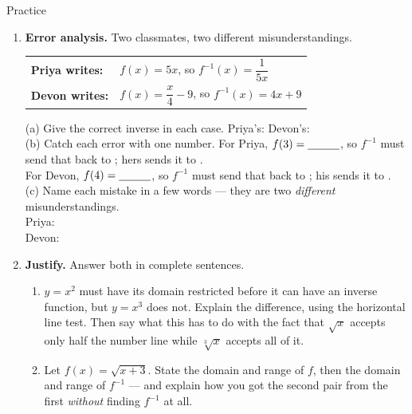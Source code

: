 \documentclass[10pt]{article}
\begin{document}
\begin{notesbox}{Practice}
\begin{enumerate}[leftmargin=1.9em, itemsep=11pt]
  \item \textbf{Error analysis.} Two classmates, two different misunderstandings.
    \begin{center}
    \begin{tcolorbox}[colback=white, colframe=charcoal!45, boxrule=0.7pt, arc=1.5mm,
        width=0.80\linewidth, left=3mm, right=3mm, top=1.5mm, bottom=1.5mm]
    \centering\small
    \renewcommand{\arraystretch}{1.5}
    \begin{tabular}{@{}l l@{}}
    \textbf{Priya writes:} & $f(x)=5x$, \; so \; $f^{-1}(x)=\dfrac{1}{5x}$ \\
    \textbf{Devon writes:} & $f(x)=\dfrac{x}{4}-9$, \; so \; $f^{-1}(x)=4x+9$ \\
    \end{tabular}
    \end{tcolorbox}
    \end{center}
    \vspace{-4pt}
    (a) Give the correct inverse in each case. \; Priya's: \blank{2.4cm} \; Devon's:
    \blank{2.6cm} \\[3pt]
    (b) Catch each error with one number. For Priya, $f(3)=\blank{1.0cm}$, so $f^{-1}$ must send
    that back to \blank{1.0cm}; hers sends it to \blank{1.4cm}. \\[3pt]
    \hspace*{0.3in} For Devon, $f(4)=\blank{1.0cm}$, so $f^{-1}$ must send that back to
    \blank{1.0cm}; his sends it to \blank{1.4cm}. \\[3pt]
    (c) Name each mistake in a few words --- they are two \emph{different} misunderstandings. \\[2pt]
    Priya: \blank{5.4cm} \\[3pt]
    Devon: \blank{5.4cm}

  \item \textbf{Justify.} Answer both in complete sentences.
    \begin{enumerate}[label=(\alph*), leftmargin=1.9em, itemsep=4pt]
      \item $y=x^{2}$ must have its domain restricted before it can have an inverse function, but
            $y=x^{3}$ does not. Explain the difference, using the horizontal line test. Then say
            what this has to do with the fact that $\sqrt{x}$ accepts only half the number line
            while $\sqrt[3]{x}$ accepts all of it.
      \item Let $f(x)=\sqrt{x+3}$. State the domain and range of $f$, then the domain and range of
            $f^{-1}$ --- and explain how you got the second pair from the first \emph{without}
            finding $f^{-1}$ at all.
    \end{enumerate}
\end{enumerate}
\end{notesbox}
\end{document}

